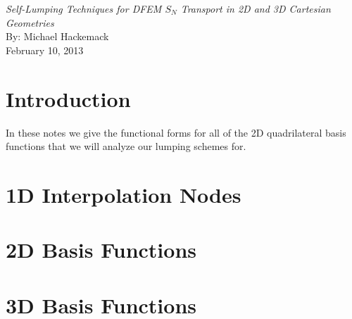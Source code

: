 \documentclass[11pt]{article}
\begin{document}
\begin{center}
{\em \huge Self-Lumping Techniques for DFEM $S_N$ Transport in 2D and 3D Cartesian Geometries}\\[8mm]
{\large By: Michael Hackemack}\\[3mm]
{\large February 10, 2013} \\[15mm]
\end{center}



\section{Introduction} \label{sec::Introduction}
In these notes we give the functional forms for all of the 2D quadrilateral basis functions that we will analyze our lumping schemes for. 



\section{1D Interpolation Nodes} \label{sec::interp}



\section{2D Basis Functions} \label{sec::2DBF}

\subsection{} \label{}

\section{3D Basis Functions} \label{sec::3DBF}
\end{document}
